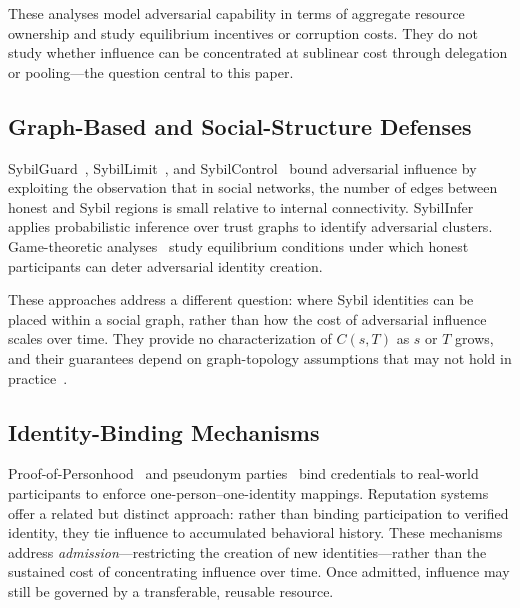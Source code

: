 \documentclass[manuscript,review]{acmart}
\theoremstyle{remark}
\begin{document}
	These analyses model adversarial capability in terms of
	aggregate resource ownership and study equilibrium
	incentives or corruption costs.
	They do not study whether influence can be concentrated
	at sublinear cost through delegation or pooling---the
	question central to this paper.
	
	\subsection{Graph-Based and Social-Structure Defenses}
	\label{ssec:rw_graph}
	
	SybilGuard~\cite{yu2006sybilguard},
	SybilLimit~\cite{yu2008sybillimit}, and
	SybilControl~\cite{li2017sybilcontrol} bound adversarial
	influence by exploiting the observation that in social
	networks, the number of edges between honest and Sybil
	regions is small relative to internal connectivity.
	SybilInfer~\cite{danezis2009sybilinfer} applies
	probabilistic inference over trust graphs to identify
	adversarial clusters.
	Game-theoretic analyses~\cite{lesniewski2020analysis}
	study equilibrium conditions under which honest participants
	can deter adversarial identity creation.
	
	These approaches address a different question: where
	Sybil identities can be placed within a social graph,
	rather than how the cost of adversarial influence scales
	over time.
	They provide no characterization of $C(s,T)$ as $s$
	or $T$ grows, and their guarantees depend on
	graph-topology assumptions that may not hold in
	practice~\cite{wang2019attack}.
	
	\subsection{Identity-Binding Mechanisms}
	\label{ssec:rw_identity}
	
	Proof-of-Personhood~\cite{borge2017pop} and pseudonym
	parties~\cite{ford2020pseudonym} bind credentials to
	real-world participants to enforce one-person--one-identity
	mappings.
	Reputation systems~\cite{resnick2000reputation} offer a
	related but distinct approach: rather than binding
	participation to verified identity, they tie influence
	to accumulated behavioral history.
	These mechanisms address \emph{admission}---restricting
	the creation of new identities---rather than the sustained
	cost of concentrating influence over time.
	Once admitted, influence may still be governed by a
	transferable, reusable resource.
	
\end{document}
